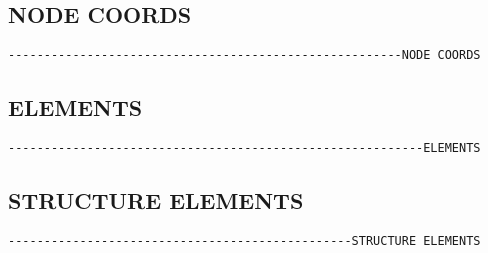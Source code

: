 \subsection{NODE COORDS}
\begin{verbatim}
-------------------------------------------------------NODE COORDS
\end{verbatim}


\subsection{ELEMENTS}
\begin{verbatim}
----------------------------------------------------------ELEMENTS
\end{verbatim}


\subsection{STRUCTURE ELEMENTS}
\begin{verbatim}
------------------------------------------------STRUCTURE ELEMENTS
\end{verbatim}


